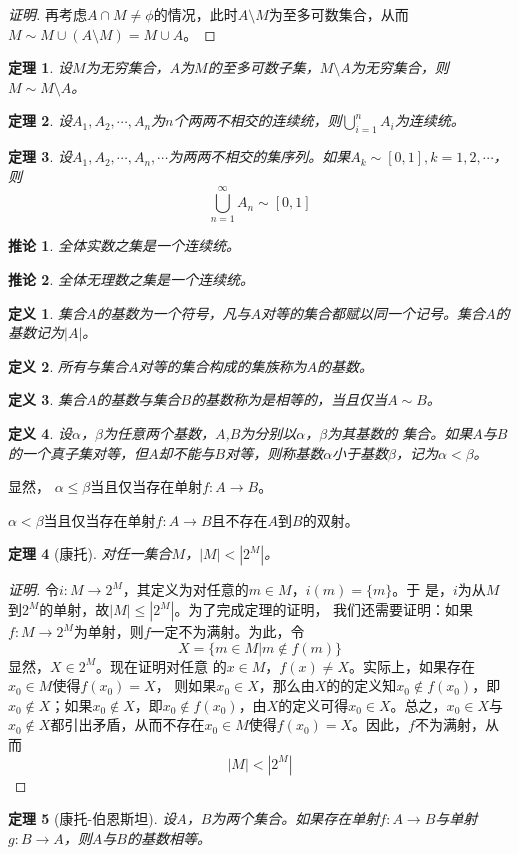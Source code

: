 \documentclass{book}[oneside]
\newtheorem{Def}{定义}[chapter]
\newtheorem{Thm}{定理}[chapter]
\newtheorem{Cor}{推论}[chapter]
\begin{document}
\begin{CJK*}{UTF8}{gbsn}
\begin{proof}[证明]
    再考虑$A\cap M\neq \phi$的情况，此时$A\setminus M$为至多可数集合，从而$M\sim M\cup(A\setminus M)=M\cup A$。
  \end{proof}
  \begin{Thm}
    设$M$为无穷集合，$A$为$M$的至多可数子集，$M\setminus A$为无穷集合，则$M \sim M\setminus A$。
  \end{Thm}
  \begin{Thm}
    设$A_1, A_2, \cdots, A_n$为$n$个两两不相交的连续统，则$\bigcup_{i=1}^nA_i$为连续统。
  \end{Thm}
  \begin{Thm}
    设$A_1, A_2, \cdots, A_n, \cdots$为两两不相交的集序列。如果$A_k \sim [0,1], k = 1, 2, \cdots$，则
    \[\bigcup_{n=1}^{\infty}A_n \sim [0,1]\]
  \end{Thm}
 \begin{Cor}
   全体实数之集是一个连续统。
 \end{Cor}
 \begin{Cor}
   全体无理数之集是一个连续统。
 \end{Cor}
  \begin{Def}
    集合$A$的基数为一个符号，凡与$A$对等的集合都赋以同一个记号。集合$A$的基数记为$|A|$。
  \end{Def}
  \begin{Def}
    所有与集合$A$对等的集合构成的集族称为$A$的基数。
  \end{Def}
    \begin{Def}
    集合$A$的基数与集合$B$的基数称为是相等的，当且仅当$A \sim B$。
  \end{Def}
  \begin{Def}
    设$\alpha$，$\beta$为任意两个基数，$A$,$B$为分别以$\alpha$，$\beta$为其基数的
    集合。如果$A$与$B$的一个真子集对等，但$A$却不能与$B$对等，则称基数$\alpha$小于基数$\beta$，记为$\alpha < \beta$。
  \end{Def}
  显然，
  $\alpha \leq \beta$当且仅当存在单射$f:A \to B$。

  $\alpha < \beta$当且仅当存在单射$f:A \to B$且不存在$A$到$B$的双射。

  \begin{Thm}[康托]
    对任一集合$M$，$|M| < |2^{M}|$。
  \end{Thm}
  \begin{proof}[证明]
    令$i:M\to
    2^M$，其定义为对任意的$m\in M$，$i(m)=\{m\}$。于
    是，$i$为从$M$到$2^M$的单射，故$|M|\leq |2^M|$。为了完成定理的证明，
    我们还需要证明：如果$f:M\to 2^M$为单射，则$f$一定不为满射。为此，令
    \[X=\{m\in M|m \notin f(m)\}\]显然，$X\in 2^M$。现在证明对任意
    的$x\in M$，$f(x)\neq X$。实际上，如果存在$x_0\in M$使得$f(x_0)=X$，
    则如果$x_0\in X$，那么由$X$的的定义知$x_0\notin
    f(x_0)$，即$x_0\notin X$；如果$x_0\notin X$，即$x_0\notin f(x_0)$，由$X$的定义可得$x_0\in X$。总之，$x_0\in X$与$x_0\notin X$都引出矛盾，从而不存在$x_0\in M$使得$f(x_0)=X$。因此，$f$不为满射，从而
    \[|M|<|2^M|\]
  \end{proof}
  \begin{Thm}[康托-伯恩斯坦]
    设$A$，$B$为两个集合。如果存在单射$f:A\to B$与单射$g:B\to A$，则$A$与$B$的基数相等。
  \end{Thm}


\end{CJK*}
\end{document}
